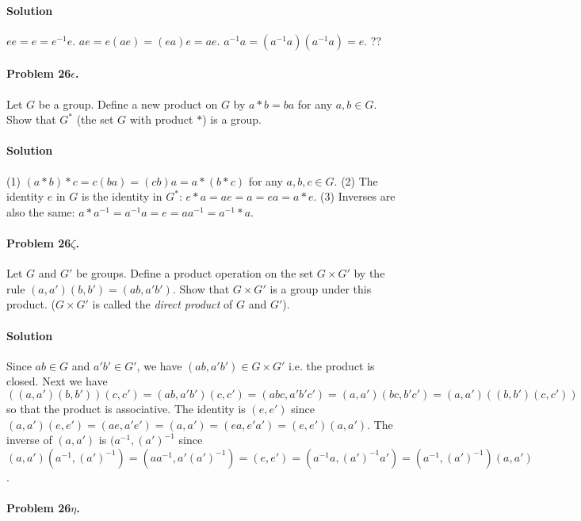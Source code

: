 \paragraph*{Solution}
$ ee = e = e^{-1} e $.
$ae = e(ae) = (ea)e = ae $.
$a^{-1} a = (a^{-1} a) (a^{-1} a) = e$.
??

\paragraph{Problem 26$\epsilon$.}
Let $G$ be a group. Define a new product on $G$ by $a * b = ba $ for any
$a, b \in G$. Show that $G^*$ (the set $G$ with product $*$) is a group.

\paragraph*{Solution}
(1) $(a*b)*c = c(ba) = (cb)a = a*(b*c)$ for any $a, b, c \in G$. (2) The identity
$e$ in $G$ is the identity in $G^*$: $e * a = ae = a = ea = a * e$.
(3) Inverses are also the same: $a * a^{-1} = a^{-1} a = e = a a^{-1} = a^{-1} * a$.

\paragraph{Problem 26$\zeta$.}
Let $G$ and $G'$ be groups. Define a product operation on the set $G \times G'$ by the
rule $(a, a')(b, b') = (ab, a'b')$. Show that $G \times G'$ is a group under this
product. ($G \times G'$ is called the \textit{direct product} of $G$ and $G'$).

\paragraph*{Solution}
Since $ab \in G$ and $a'b' \in G'$, we have $(ab, a'b') \in G \times G'$ i.e. the
product is closed. Next we have $((a,a')(b,b'))(c,c') = (ab, a'b')(c,c') =
(abc, a'b'c') = (a, a')(bc, b'c') = (a,a')((b,b')(c,c')) $ so that the product
is associative. The identity is $(e, e')$ since $(a,a')(e,e') = (ae, a'e') =
(a,a') = (ea, e'a') = (e,e')(a,a')$. The inverse of $(a, a')$ is $(a^{-1},(a')^{-1}$
since $(a,a')(a^{-1},(a')^{-1}) = (aa^{-1},a'(a')^{-1}) = (e,e') =
(a^{-1}a, (a')^{-1}a') = (a^{-1},(a')^{-1})(a,a')$.

\paragraph{Problem 26$\eta$.}

